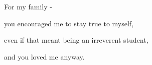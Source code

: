 \begin{dedication}

\bigskip

${}$ \\

\bigskip

${}$ \\

\bigskip

${}$ \\

\bigskip

\begin{center}
\begin{Large}

For my family -

you encouraged me to stay true to myself,

even if that meant being an irreverent student,
 
and you loved me anyway.

\end{Large}
\end{center}


\end{dedication} 